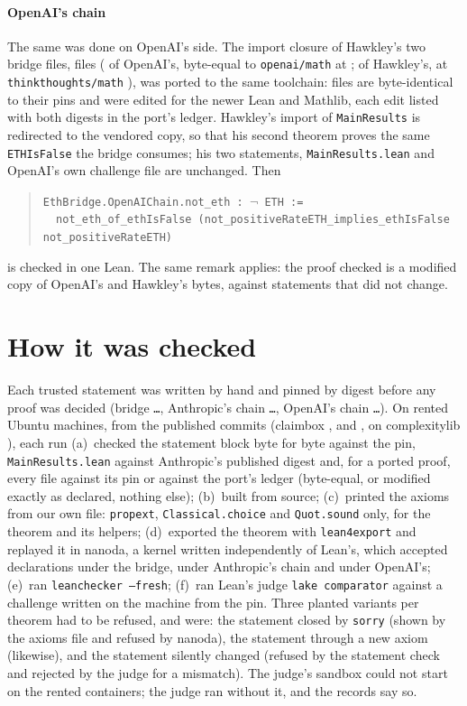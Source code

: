 \documentclass[preprint,11pt,authoryear,a4paper]{elsarticle}
\newcommand{\lean}[1]{\texttt{#1}}
\begin{document}
\paragraph{OpenAI's chain} The same was done on OpenAI's side. The import closure of Hawkley's two bridge files, \EcOaPortFiles{} files (\EcOaOpenAIFiles{} of OpenAI's, byte-equal to \lean{openai/math} at \EcOpenAICommit; \EcOaHawkleyFiles{} of Hawkley's, at \lean{thinkthoughts/math} \EcHawkleyCommit), was ported to the same toolchain: \EcOaPortSame{} files are byte-identical to their pins and \EcOaPortEdited{} were edited for the newer Lean and Mathlib, each edit listed with both digests in the port's ledger. Hawkley's import of \lean{MainResults} is redirected to the vendored copy, so that his second theorem proves the same \lean{ETHIsFalse} the bridge consumes; his two statements, \lean{MainResults.lean} and OpenAI's own challenge file are unchanged. Then
\begin{quote}
\lean{EthBridge.OpenAIChain.not\_eth : $\neg$\,ETH :=}\\
\lean{\ \ not\_eth\_of\_ethIsFalse (not\_positiveRateETH\_implies\_ethIsFalse not\_positiveRateETH)}
\end{quote}
is checked in one Lean. The same remark applies: the proof checked is a modified copy of OpenAI's and Hawkley's bytes, against statements that did not change.

\section{How it was checked}\label{sec:check}

Each trusted statement was written by hand and pinned by digest before any proof was decided (bridge \texttt{\EcCtwoPinSha\dots}, Anthropic's chain \texttt{\EcChainPinSha\dots}, OpenAI's chain \texttt{\EcOaPinSha\dots}). On rented Ubuntu machines, from the published commits (claimbox \EcClaimboxCtwo, \EcClaimboxChain{} and \EcOaClaimbox, on complexitylib \EcComplexitylib), each run (a)~checked the statement block byte for byte against the pin, \lean{MainResults.lean} against Anthropic's published digest and, for a ported proof, every file against its pin or against the port's ledger (byte-equal, or modified exactly as declared, nothing else); (b)~built from source; (c)~printed the axioms from our own file: \lean{propext}, \lean{Classical.choice} and \lean{Quot.sound} only, for the theorem and its helpers; (d)~exported the theorem with \lean{lean4export} and replayed it in nanoda, a kernel written independently of Lean's, which accepted \EcCtwoNanoda{} declarations under the bridge, \EcChainNanoda{} under Anthropic's chain and \EcOaNanoda{} under OpenAI's; (e)~ran \lean{leanchecker --fresh}; (f)~ran Lean's judge \lean{lake comparator} against a challenge written on the machine from the pin. Three planted variants per theorem had to be refused, and were: the statement closed by \lean{sorry} (shown by the axioms file and refused by nanoda), the statement through a new axiom (likewise), and the statement silently changed (refused by the statement check and rejected by the judge for a mismatch). The judge's sandbox could not start on the rented containers; the judge ran without it, and the records say so.
\end{document}
